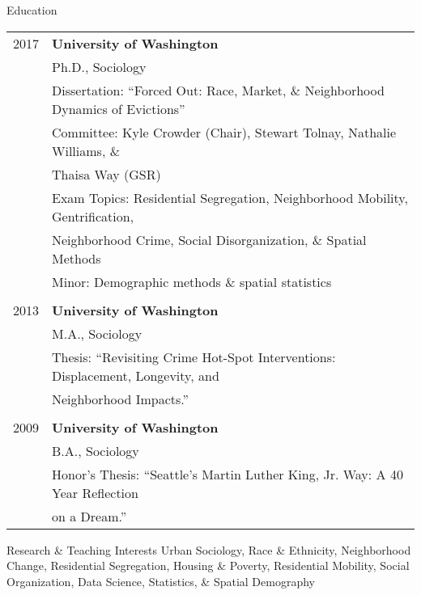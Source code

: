 \documentclass{resume} %
\begin{document}
\begin{rSection}{Education}
\vspace{5mm}
\begin{tabular}{ @{} >{}l @{\hspace{6ex}} l }

2017 	& \textbf{University of Washington}\\
		& Ph.D., Sociology\\
		& Dissertation: ``Forced Out: Race, Market, \& Neighborhood Dynamics of Evictions''\\
		& Committee: Kyle Crowder (Chair), Stewart Tolnay, Nathalie Williams, \&\\
		&\hspace{.79in}Thaisa Way (GSR)\\
		& Exam Topics: Residential Segregation, Neighborhood Mobility, Gentrification,\\
		& \hspace*{.91in}Neighborhood Crime, Social Disorganization, \& Spatial Methods\\
		& Minor: Demographic methods \& spatial statistics\\\\

2013	& \textbf{University of Washington}\\
		& M.A., Sociology\\
		& Thesis: ``Revisiting Crime Hot-Spot Interventions: Displacement, Longevity, and\\
		& \hspace*{.56in}Neighborhood Impacts.''\\\\

2009	& \textbf{University of Washington}\\
		& B.A., Sociology\\
		& Honor's Thesis: ``Seattle's Martin Luther King, Jr. Way: A 40 Year Reflection\\
		& \hspace*{1.12in}on a Dream.''
\end{tabular}
\vspace{5mm}
\end{rSection}



\pagebreak
\begin{rSection}{Research \& Teaching Interests}
\vspace{5mm}
Urban Sociology, Race \& Ethnicity, Neighborhood Change, Residential Segregation, Housing \& Poverty, Residential Mobility, Social Organization, Data Science, Statistics, \& Spatial Demography
\vspace{5mm}
\end{rSection}
\end{document}
